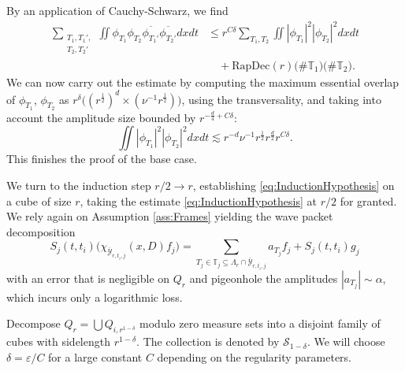 \documentclass{amsart}
\theoremstyle{definition}
\newcommand{\T}{\mathbb{T}}
\begin{document}
By an application of Cauchy-Schwarz, we find
\begin{equation*}
\begin{split}
   \sum_{\substack{T_1,T_1', \\ T_2,T_2'}} \iint \phi_{T_1} \phi_{T_2} \overline{\phi_{T_1'}} \overline{\phi_{T_2'}} dx dt &\leq r^{C \delta} \sum_{T_1,T_2} \iint |\phi_{T_1}|^2 |\phi_{T_2}|^2 dx dt \\ 
   &\quad + \text{RapDec}(r) \big( \# \T_1 \big) \big( \# \T_2 \big).
   \end{split}
\end{equation*}
We can now carry out the estimate by computing the maximum essential overlap of $\phi_{T_1}$, $\phi_{T_2}$ as $r^{\delta} \big( (r^{\frac{1}{2}})^d \times (\nu^{-1} r^{\frac{1}{2}}) \big)$, using the transversality, and taking into account the amplitude size bounded by $r^{-\frac{d}{4}+C \delta}$:
\begin{equation*}
    \iint |\phi_{T_1}|^2 |\phi_{T_2}|^2 dx dt \lesssim r^{-d} \nu^{-1} r^{\frac{1}{2}} r^{\frac{d}{2}} r^{C \delta}.
\end{equation*}
This finishes the proof of the base case.

\medskip

We turn to the induction step $r /2 \to r$, establishing \eqref{eq:InductionHypothesis} on a cube of size $r$, taking the estimate \eqref{eq:InductionHypothesis} at $r/2$ for granted.  
We rely again on Assumption \ref{ass:Frames} yielding the wave packet decomposition
\begin{equation*}
S_j(t,t_i) \big( \chi_{\overline{\mathcal{Y}}_{r,t_i,j}}(x,D) f_j \big) = \sum_{T_j \in \T_j \subseteq \Lambda_r \cap \overline{\mathcal{Y}}_{r,t_i,j}} a_{T_j} f_j + S_j(t,t_i) g_j
\end{equation*}
with an error that is negligible on $Q_r$ and pigeonhole the amplitudes $|a_{T_j}| \sim \alpha$, which incurs only a logarithmic loss.

\smallskip

Decompose $Q_r = \bigcup Q_{i,r^{1-\delta}}$ modulo zero measure sets into a disjoint family of cubes with sidelength $r^{1-\delta}$. The collection is denoted by $\mathcal{S}_{1-\delta}$. We will choose $\delta=\varepsilon / C$ for a large constant $C$ depending on the regularity parameters.

\smallskip
\end{document}
